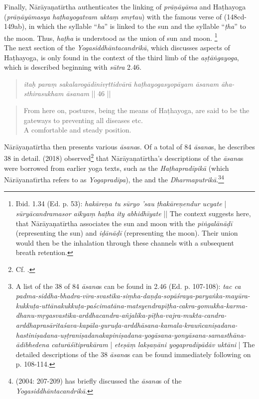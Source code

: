 Finally, Nārāyaṇatīrtha authenticates the linking of \textit{prāṇāyāma} and Haṭhayoga (\textit{prāṇāyāmasya haṭhayogatvam uktaṃ smṛtau}) with the famous verse of  (148cd-149ab), in which the syllable ``\textit{ha}'' is linked to the sun and the syllable ``\textit{ṭha}'' to the moon. Thus, \textit{haṭha} is understood as the union of sun and moon. \footnote{Ibid. 1.34 (Ed. p. 53): \textit{hakāreṇa tu sūryo 'sau ṭhakāreṇendur ucyate} | \textit{sūryācandramasor aikyaṃ haṭha ity abhidhīyate} || The context suggests here, that Nārāyaṇatīrtha associates the sun and moon with the \textit{piṅgalānāḍī} (representing the sun) and \textit{iḍānāḍī} (representing the moon). Their union would then be the inhalation through these channels with a subsequent breath retention.}\\

The next section of the \textit{Yogasiddhāntacandrikā}, which discusses aspects of Haṭhayoga, is only found in the context of the third limb of the \textit{aṣṭāṅgayoga}, which is described beginning with \textit{sūtra} 2.46.

\begin{quote} \textit{itaḥ paraṃ sakalarogādinivṛttidvārā haṭhayogasyopāyam āsanam āha- \\
sthirasukham āsanam} || 46 || \end{quote}
\begin{quote} From here on, postures, being the means of Haṭhayoga, are said to be the gateways to preventing all diseases etc. \\
A comfortable and steady position.
\end{quote}

Nārāyaṇatīrtha then presents various \textit{āsana}s. Of a total of 84 \textit{āsana}s, he describes 38 in detail. \citeauthor{birch2018proliferation} (2018) observed\footnote{Cf. \citeauthor[2018: 105, n. 9]{birch2018proliferation}.} that Nārāyaṇatīrtha's descriptions of the \textit{āsana}s were borrowed from earlier yoga texts, such as the \textit{Haṭhapradīpikā} (which Nārāyanatı̄rtha refers to as \textit{Yogapradīpa}), the  and the \textit{Dharmaputrikā}.\footnote{A list of the 38 of 84 \textit{āsana}s can be found in  2.46 (Ed. p. 107-108): \textit{tac ca padma-siddha-bhadra-vīra-svastika-siṃha-daṇḍa-sopāśraya-paryaṅka-mayūra-kukkuṭa-uttānakukkuṭa-paścimatāna-matsyendrapīṭha-cakra-gomukha-karma-dhanu-mṛgasvastika-arddhacandra-añjalika-pīṭha-vajra-mukta-candra-arddhaprasāritaśava-kapāla-guruḍa-arddhāsana-kamala-krauñcaniṣadana-hastiniṣadana-uṣṭraniṣadanakapiniṣadana-yogāsana-yonyāsana-samasthāna-ādibhedena caturāśītiprakāram} | \textit{eteṣāṃ lakṣaṇāni yogapradīpādāv uktāni} | The detailed descriptions of the 38 \textit{āsana}s can be found immediately following on p. 108-114.}\footnote{\citeauthor{penna2004} (2004: 207-209) has briefly discussed the \textit{āsana}s of the \textit{Yogasiddhāntacandrikā}.}

